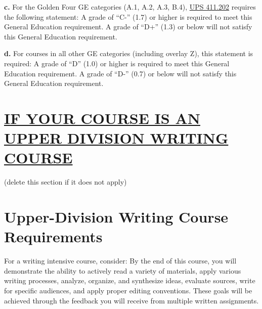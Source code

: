 \documentclass[12pt]{article}
\begin{document}
\vspace{0.5em}

\noindent \textbf{c.} {\color{annotationblue}For the Golden Four GE categories (A.1, A.2, A.3, B.4), \href{https://www.fullerton.edu/senate/publications_policies_resolutions/ups/UPS\%20400/UPS\%20411.202.pdf}{UPS 411.202} requires the following statement:} A grade of ``C-'' (1.7) or higher is required to meet this General Education requirement. A grade of ``D+'' (1.3) or below will not satisfy this General Education requirement.

\vspace{0.5em}

\noindent \textbf{d.} {\color{annotationblue}For courses in all other GE categories (including overlay Z), this statement is required:} A grade of ``D'' (1.0) or higher is required to meet this General Education requirement. A grade of ``D-'' (0.7) or below will not satisfy this General Education requirement.

\section*{\underline{IF YOUR COURSE IS AN UPPER DIVISION WRITING COURSE}} {\color{annotationblue}(delete this section if it does not apply)}

\section*{Upper-Division Writing Course Requirements}

 {\color{suggestionred}For a writing intensive course, consider: By the end of this course, you will demonstrate the ability to actively read a variety of materials, apply various writing processes, analyze, organize, and synthesize ideas, evaluate sources, write for specific audiences, and apply proper editing conventions. These goals will be achieved through the feedback you will receive from multiple written assignments.}

\vspace{0.5em}
\end{document}
